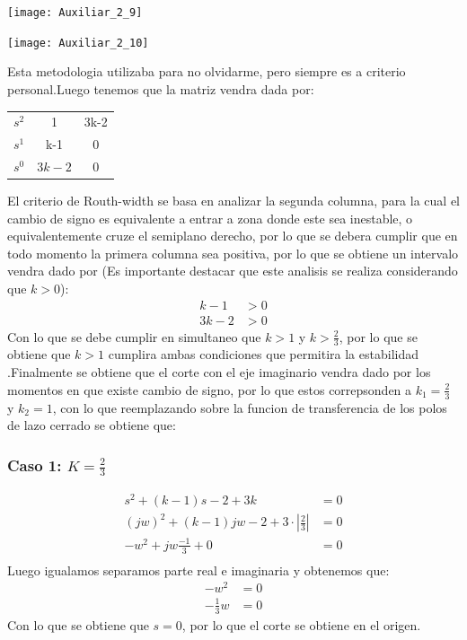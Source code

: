 \documentclass[
  11pt,
  letterpaper,
   addpoints,
  ]{exam}
\begin{document}
\begin{questions}
\begin{solution}
\begin{center}
  \end{center}
  \begin{center}
    \texttt{[image: Auxiliar\_2\_9]}
  \end{center}
  \begin{center}
    \texttt{[image: Auxiliar\_2\_10]}
  \end{center}
Esta metodologia utilizaba para no olvidarme, pero siempre es a criterio personal.Luego tenemos que la matriz vendra dada por:
\begin{center}
    \begin{tabular}{|c|cc|}
        \hline
        $s^{2}$ & 1 & 3k-2\\
        $s^{1}$ & k-1 & 0\\
        $s^{0}$ & $3k-2$ & 0\\
        \hline
    \end{tabular}
\end{center}
El criterio de Routh-width se basa en analizar la segunda columna, para la cual el cambio de signo es equivalente a entrar a zona donde este sea inestable, o equivalentemente cruze el semiplano derecho, por lo que se debera cumplir que en todo momento la primera columna sea positiva, por lo que se obtiene un intervalo vendra dado por (Es importante destacar que este analisis se realiza considerando que $k>0$):
\begin{align}
    k-1 &> 0\\
    3k-2 &> 0
\end{align}
Con lo que se debe cumplir en simultaneo que $k>1$ y $k>\frac{2}{3}$, por lo que se obtiene que $k>1$ cumplira ambas condiciones que permitira la estabilidad .Finalmente se obtiene que el corte con el eje imaginario vendra dado por los momentos en que existe cambio de signo, por lo que estos correpsonden a $k_{1} = \frac{2}{3}$ y $k_{2}=1$, con lo que reemplazando sobre la funcion de transferencia de los polos de lazo cerrado se obtiene que:
\subsubsection*{Caso 1: $K=\frac{2}{3}$}
\begin{align}
    s^{2}+(k-1)s-2+3k &= 0\\
    (jw)^{2}+(k-1)jw-2+3\cdot \left|\frac{2}{3}\right| &= 0\\
    -w^{2}+jw\frac{-1}{3} +0 &= 0\\
\end{align}
Luego igualamos separamos parte real e imaginaria y obtenemos que:
\begin{align}
    -w^{2} &= 0\\
    -\frac{1}{3}w &= 0
\end{align}
Con lo que se obtiene que $s=0$, por lo que el corte se obtiene en el origen.

\end{solution}
\end{questions}
\end{document}
